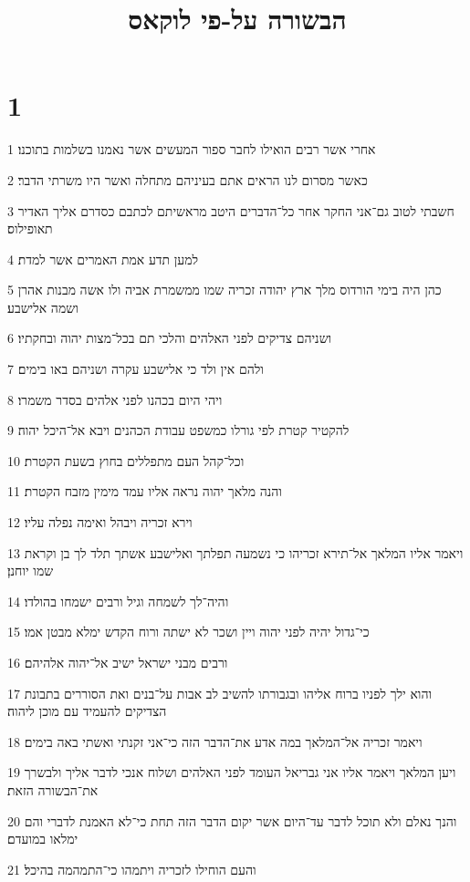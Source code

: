 

\title{הבשורה על-פי לוקאס}


\chapter{1}

\par 1 אחרי אשר רבים הואילו לחבר ספור המעשים אשר נאמנו בשלמות בתוכנו׃
\par 2 כאשר מסרום לנו הראים אתם בעיניהם מתחלה ואשר היו משרתי הדבר׃
\par 3 חשבתי לטוב גם־אני החקר אחר כל־הדברים היטב מראשיתם לכתבם כסדרם אליך האדיר תאופילוס׃
\par 4 למען תדע אמת האמרים אשר למדת׃
\par 5 כהן היה בימי הורדוס מלך ארץ יהודה זכריה שמו ממשמרת אביה ולו אשה מבנות אהרן ושמה אלישבע׃
\par 6 ושניהם צדיקים לפני האלהים והלכי תם בכל־מצות יהוה ובחקתיו׃
\par 7 ולהם אין ולד כי אלישבע עקרה ושניהם באו בימים׃
\par 8 ויהי היום בכהנו לפני אלהים בסדר משמרו׃
\par 9 להקטיר קטרת לפי גורלו כמשפט עבודת הכהנים ויבא אל־היכל יהוה׃
\par 10 וכל־קהל העם מתפללים בחוץ בשעת הקטרת׃
\par 11 והנה מלאך יהוה נראה אליו עמד מימין מזבח הקטרת׃
\par 12 וירא זכריה ויבהל ואימה נפלה עליו׃
\par 13 ויאמר אליו המלאך אל־תירא זכריהו כי נשמעה תפלתך ואלישבע אשתך תלד לך בן וקראת שמו יוחנן׃
\par 14 והיה־לך לשמחה וגיל ורבים ישמחו בהולדו׃
\par 15 כי־גדול יהיה לפני יהוה ויין ושכר לא ישתה ורוח הקדש ימלא מבטן אמו׃
\par 16 ורבים מבני ישראל ישיב אל־יהוה אלהיהם׃
\par 17 והוא ילך לפניו ברוח אליהו ובגבורתו להשיב לב אבות על־בנים ואת הסוררים בתבונת הצדיקים להעמיד עם מוכן ליהוה׃
\par 18 ויאמר זכריה אל־המלאך במה אדע את־הדבר הזה כי־אני זקנתי ואשתי באה בימים׃
\par 19 ויען המלאך ויאמר אליו אני גבריאל העומד לפני האלהים ושלוח אנכי לדבר אליך ולבשרך את־הבשורה הזאת׃
\par 20 והנך נאלם ולא תוכל לדבר עד־היום אשר יקום הדבר הזה תחת כי־לא האמנת לדברי והם ימלאו במועדם׃
\par 21 והעם הוחילו לזכריה ויתמהו כי־התמהמה בהיכל׃
